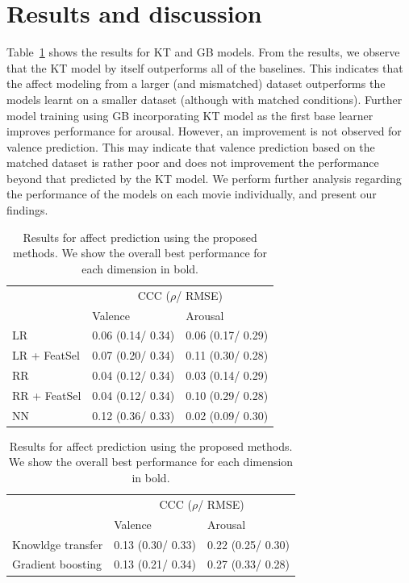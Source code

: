 \documentclass{article}
\begin{document}
\section{Results and discussion}
Table~\ref{} shows the results for KT and GB models.
From the results, we observe that the KT model by itself outperforms all of the baselines.
This indicates that the affect modeling from a larger (and mismatched) dataset outperforms the models learnt on a smaller dataset (although with matched conditions). 
Further model training using GB incorporating KT model as the first base learner improves performance for arousal. 
However, an improvement is not observed for valence prediction.
This may indicate that valence prediction based on the matched dataset is rather poor and does not improvement the performance beyond that predicted by the KT model.
We perform further analysis regarding the performance of the models on each movie individually, and present our findings. 

\begin{table}[t]
\centering
\caption{Results for affect prediction using the baseline regressors. The best performances for each dimension are shown in bold.}
\begin{tabular}{@{}l|l|l@{}}
\hline
				        & \multicolumn{2}{c}{CCC ($\rho$/ RMSE)}\\ \cline{2-3}
				        & Valence       & Arousal \\ \hline
LR           & 0.06 (0.14/ 0.34) & 0.06 (0.17/ 0.29) \\ 
LR + FeatSel & 0.07 (0.20/ 0.34) & 0.11 (0.30/ 0.28) \\ 
RR           & 0.04 (0.12/ 0.34) & 0.03 (0.14/ 0.29) \\ 
RR + FeatSel & 0.04 (0.12/ 0.34) & 0.10 (0.29/ 0.28) \\ 
NN           & 0.12 (0.36/ 0.33) & 0.02 (0.09/ 0.30) \\ 
\end{tabular}
\label{Baseline_table}
\caption{Results for affect prediction using the proposed methods. We show the overall best performance for each dimension in bold.} 
\begin{tabular}{@{}l|l|l@{}}
\hline
				        & \multicolumn{2}{c}{CCC ($\rho$/ RMSE)}\\ \cline{2-3}
				        & Valence       & Arousal \\ \hline
Knowldge transfer& 0.13 (0.30/ 0.33) & 0.22 (0.25/ 0.30) \\ 
Gradient boosting& 0.13 (0.21/ 0.34) & 0.27 (0.33/ 0.28) \\ 
\end{tabular}
\label{KT_table}
\end{table}
\end{document}

